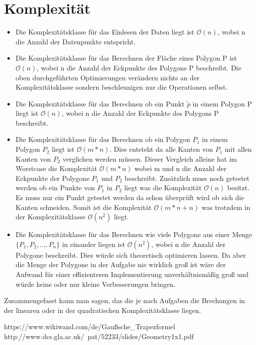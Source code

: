\documentclass[conference]{IEEEtran}
\begin{document}
	\section{Komplexität}
	\begin{itemize}
		\item Die Komplexitätsklasse für das Einlesen der Daten liegt ist $\mathcal{O}(n)$, wobei n die Anzahl der Datenpunkte entspricht.
		
		\item Die Komplexitätsklasse für das Berechnen der Fläche eines Polygon P ist $\mathcal{O}(n)$, wobei n die Anzahl der Eckpunkte des Polygons P beschreibt. Die oben durchgeführten Optimierungen verändern nichts an der Komplexitätsklasse sondern beschleunigen nur die Operationen selbst.
		
		\item Die Komplexitätsklasse für das Berechnen ob ein Punkt $\tilde{p}$ in einem Polygon P liegt ist $\mathcal{O}(n)$, wobei n die Anzahl der Eckpunkte des Polygons P beschreibt.
		
		\item Die Komplexitätsklasse für das Berechnen ob ein Polygon $P_1$ in einem Polygon $P_2$ liegt ist $\mathcal{O}(m*n)$. Dies entsteht da alle Kanten von $P_1$ mit allen Kanten von $P_2$ verglichen werden müssen. Dieser Vergleich alleine hat im Worstcase die Komplexität $\mathcal{O}(m*n)$  wobei m und n die Anzahl der Eckpunkte der Polygone $P_1$ und $P_2$ beschreibt. Zusätzlich muss noch getestet werden ob ein Punkte von $P_1$ in $P_2$ liegt was die Komplexität $\mathcal{O}(n)$ besitzt. Es muss nur ein Punkt getestet werden da schon überprüft wird ob sich die Kanten schneiden. Somit ist die Komplexität $\mathcal{O}(m*n+n)$ was trotzdem in der Komplexitätsklasse $\mathcal{O}(n^2)$ liegt.
		
		\item Die Komplexitätsklasse für das Berechnen wie viele Polygone aus einer Menge $\{P_1,P_2,...,P_n\}$ in einander liegen ist $\mathcal{O}(n^2)$, wobei n die Anzahl der Polygone beschreibt. Dies würde sich theoretisch optimieren lassen. Da aber die Menge der Polygone in der Aufgabe nie wirklich groß ist wäre der Aufwand für einer effizienteren Implementierung unverhältnismäßig groß und würde keine oder nur kleine Verbesserungen bringen.
	\end{itemize}
	Zusammengefasst kann man sagen, das die je nach Aufgaben die Brechungen in der linearen oder in der quadratischen Komplexitätsklasse liegen.
	
	\begin{thebibliography}{00}
		https://www.wikiwand.com/de/Gaußsche\_Trapezformel
		http://www.dcs.gla.ac.uk/~pat/52233/slides/Geometry1x1.pdf
	\end{thebibliography}
	
\end{document}
